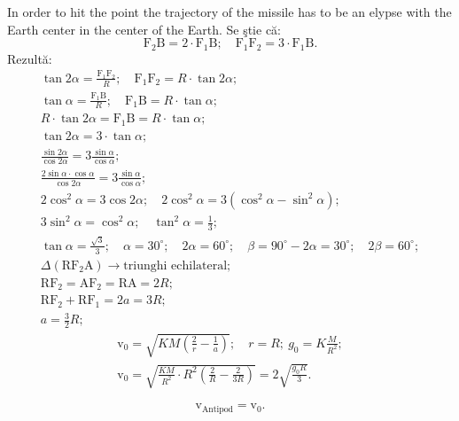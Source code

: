 \begin{description}
  In order to hit the point the trajectory of the missile has to be an elypse %
  with the Earth center in the center of the Earth. Se \c{s}tie c\u{a}: %
  \[
    \mathrm{F_2B} = 2\cdot\mathrm{F_1B};\quad
    \mathrm{F_1F_2} = 3\cdot\mathrm{F_1B}.
  \]
  Rezult\u{a}: %
  \begin{gather*}
    \tan2\alpha = \frac{\mathrm{F_1F_2}}{R};\quad
      \mathrm{F_1F_2} = R\cdot\tan2\alpha; \\
    \tan\alpha = \frac{\mathrm{F_1B}}{R};\quad
      \mathrm{F_1B} = R\cdot\tan\alpha; \\
    R\cdot\tan2\alpha = \mathrm{F_1B} = R\cdot\tan\alpha; \\ %
    \tan2\alpha = 3\cdot\tan\alpha; \\
    \frac{\sin2\alpha}{\cos2\alpha} = 3\frac{\sin\alpha}{\cos\alpha}; \\
    \frac{2\sin\alpha\cdot\cos\alpha}{\cos2\alpha}
      = 3\frac{\sin\alpha}{\cos\alpha}; \\
    2\cos^2\alpha = 3\cos2\alpha;\quad
      2\cos^2\alpha = 3\left(\cos^2\alpha - \sin^2\alpha\right); \\
    3\sin^2\alpha = \cos^2\alpha;\quad \tan^2\alpha = \frac{1}{3}; \\
    \tan\alpha = \frac{\sqrt{3}}{3};\quad \alpha = 30^\circ;\quad
      2\alpha = 60^\circ;\quad
      \beta = 90^\circ - 2\alpha = 30^\circ;\quad 2\beta = 60^\circ; \\
    \Delta(\mathrm{RF_2A}) \rightarrow \text{triunghi echilateral;} \\ %
    \mathrm{RF_2} = \mathrm{AF_2} = \mathrm{RA} = 2R; \\
    \mathrm{RF_2} + \mathrm{RF_1} = 2a = 3R; \\
    a = \frac{3}{2}R;
  \end{gather*}
  \begin{gather*}
    \mathrm{v}_0 = \sqrt{KM\left(\frac{2}{r} - \frac{1}{a}\right)};\quad
      r = R;\ g_0 = K\frac{M}{R^2}; \\
    \mathrm{v}_0 = \sqrt{\frac{KM}{R^2}\cdot R^2
      \left(\frac{2}{R} - \frac{2}{3R}\right)}
      = 2\sqrt{\frac{g_0R}{3}}.
  \end{gather*}

\item[c)]
  \[
    \mathrm{v}_{\mathrm{Antipod}} = \mathrm{v}_0.
  \]


\end{description}
